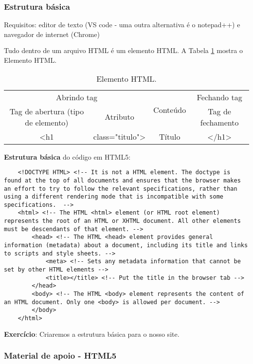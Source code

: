 \documentclass[12pt,a4paper]{article}
\begin{document}
	\subsubsection{Estrutura básica}
	
	Requisitos: editor de texto (VS code - uma outra alternativa é o notepad++) e navegador de internet (Chrome)
	
	Tudo dentro de um arquivo HTML é um elemento HTML. A Tabela \ref{tab:ElementoHTML} mostra o Elemento HTML.
	
	\begin{table}[!htpb]
		\centering
		\begin{tabular}{|c|c|c|c|}%
			\hline
			\multicolumn{2}{|c|}{Abrindo tag} & \multirow{2}{*}{Conteúdo} & Fechando tag  \\
			\cline{1-2} \cline{4-4}
			Tag de abertura (tipo de elemento) & Atributo &  & Tag de fechamento\\
			\hline
			<h1 & class="titulo"> & Título & </h1> \\
			\hline
		\end{tabular}
		\caption{Elemento HTML.}
		\label{tab:ElementoHTML}
	\end{table}
	
	\textbf{Estrutura básica} do código em HTML5: 
	
	\begin{lstlisting} 
	<!DOCTYPE HTML> <!-- It is not a HTML element. The doctype is found at the top of all documents and ensures that the browser makes an effort to try to follow the relevant specifications, rather than using a different rendering mode that is incompatible with some specifications.  -->
	<html> <!--	The HTML <html> element (or HTML root element) represents the root of an HTML or XHTML document. All other elements must be descendants of that element. -->
		<head> <!-- The HTML <head> element provides general information (metadata) about a document, including its title and links to scripts and style sheets. -->
			<meta> <!-- Sets any metadata information that cannot be set by other HTML elements -->
			<title></title> <!-- Put the title in the browser tab -->
		</head>
		<body> <!-- The HTML <body> element represents the content of an HTML document. Only one <body> is allowed per document. -->
		</body>
	</html>
	\end{lstlisting}
	
	
	\textbf{Exercício}: Criaremos a estrutura básica para o nosso site.
	
	\subsubsection{Material de apoio - HTML5}
\end{document}
